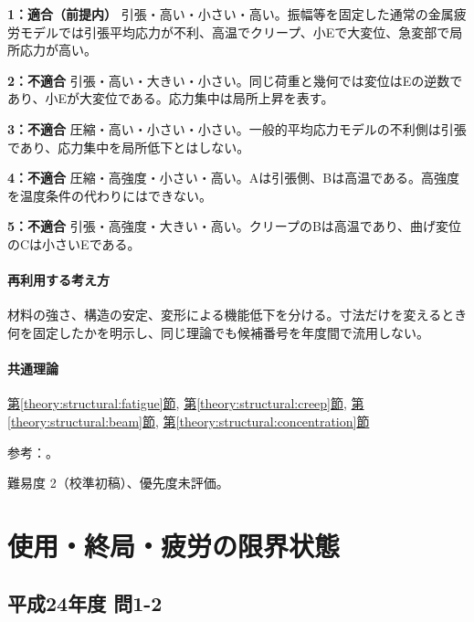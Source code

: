 \noindent\textbf{1：適合（前提内）} 引張・高い・小さい・高い。振幅等を固定した通常の金属疲労モデルでは引張平均応力が不利、高温でクリープ、小Eで大変位、急変部で局所応力が高い。\par

\noindent\textbf{2：不適合} 引張・高い・大きい・小さい。同じ荷重と幾何では変位はEの逆数であり、小Eが大変位である。応力集中は局所上昇を表す。\par

\noindent\textbf{3：不適合} 圧縮・高い・小さい・小さい。一般的平均応力モデルの不利側は引張であり、応力集中を局所低下とはしない。\par

\noindent\textbf{4：不適合} 圧縮・高強度・小さい・高い。Aは引張側、Bは高温である。高強度を温度条件の代わりにはできない。\par

\noindent\textbf{5：不適合} 引張・高強度・大きい・高い。クリープのBは高温であり、曲げ変位のCは小さいEである。\par

\paragraph{再利用する考え方} 材料の強さ、構造の安定、変形による機能低下を分ける。寸法だけを変えるとき何を固定したかを明示し、同じ理論でも候補番号を年度間で流用しない。

\paragraph{共通理論} \hyperref[theory:structural:fatigue]{第\ref*{theory:structural:fatigue}節}, \hyperref[theory:structural:creep]{第\ref*{theory:structural:creep}節}, \hyperref[theory:structural:beam]{第\ref*{theory:structural:beam}節}, \hyperref[theory:structural:concentration]{第\ref*{theory:structural:concentration}節}

\par 参考：\cite{struct_nims_data,struct_nasa_mean,struct_mit_beam}。

\par 難易度 2（校準初稿）、優先度未評価。

\section{使用・終局・疲労の限界状態}

\subsection{平成24年度 問1-2}
\label{q:h24-reg-basic-1-2}

